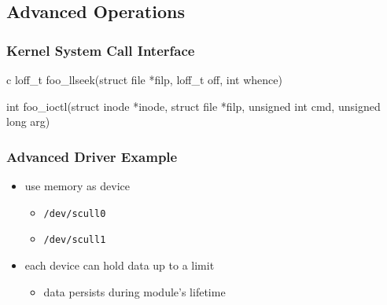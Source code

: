 \documentclass[dvipsnames]{beamer}
\begin{document}
\subsection{Advanced Operations}
%
%

\begin{frame}[fragile]
  \frametitle{Kernel System Call Interface}

  \begin{pygments}{c}
loff_t foo_llseek(struct file *filp,
                  loff_t off,
                  int whence)

int foo_ioctl(struct inode *inode,
              struct file *filp,
              unsigned int cmd,
              unsigned long arg)
  \end{pygments}
\end{frame}

\begin{frame}
  \frametitle{Advanced Driver Example}

  \begin{example}
    \begin{itemize}
      \item use memory as device
      \begin{itemize}
        \item \texttt{/dev/scull0}
        \item \texttt{/dev/scull1}
      \end{itemize}

      \pause
      \item each device can hold data up to a limit
      \begin{itemize}
        \item data persists during module's lifetime
      \end{itemize}
    \end{itemize}
  \end{example}
\end{frame}
\end{document}
